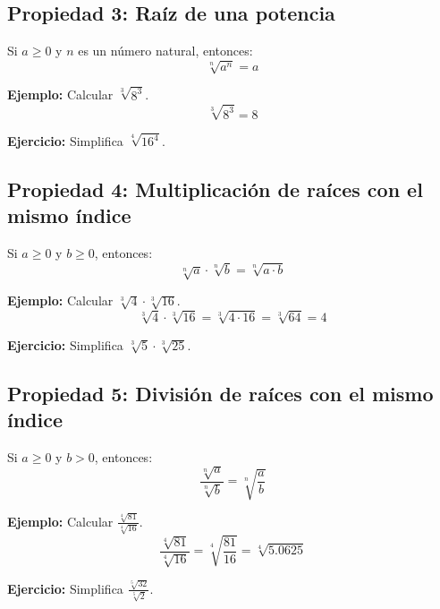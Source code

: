 \documentclass[
  11pt,
  letterpaper,
  answers
]{exam}
\begin{document}
\subsection*{Propiedad 3: Raíz de una potencia}
Si \( a \geq 0 \) y \( n \) es un número natural, entonces:
\[
\sqrt[n]{a^n} = a
\]

\textbf{Ejemplo:} Calcular \( \sqrt[3]{8^3} \).
\[
\sqrt[3]{8^3} = 8
\]

\textbf{Ejercicio:} Simplifica \( \sqrt[4]{16^4} \).

\subsection*{Propiedad 4: Multiplicación de raíces con el mismo índice}
Si \( a \geq 0 \) y \( b \geq 0 \), entonces:
\[
\sqrt[n]{a} \cdot \sqrt[n]{b} = \sqrt[n]{a \cdot b}
\]

\textbf{Ejemplo:} Calcular \( \sqrt[3]{4} \cdot \sqrt[3]{16} \).
\[
\sqrt[3]{4} \cdot \sqrt[3]{16} = \sqrt[3]{4 \cdot 16} = \sqrt[3]{64} = 4
\]

\textbf{Ejercicio:} Simplifica \( \sqrt[3]{5} \cdot \sqrt[3]{25} \).

\subsection*{Propiedad 5: División de raíces con el mismo índice}
Si \( a \geq 0 \) y \( b > 0 \), entonces:
\[
\frac{\sqrt[n]{a}}{\sqrt[n]{b}} = \sqrt[n]{\frac{a}{b}}
\]

\textbf{Ejemplo:} Calcular \( \frac{\sqrt[4]{81}}{\sqrt[4]{16}} \).
\[
\frac{\sqrt[4]{81}}{\sqrt[4]{16}} = \sqrt[4]{\frac{81}{16}} = \sqrt[4]{5.0625}
\]

\textbf{Ejercicio:} Simplifica \( \frac{\sqrt[5]{32}}{\sqrt[5]{2}} \).
\end{document}
